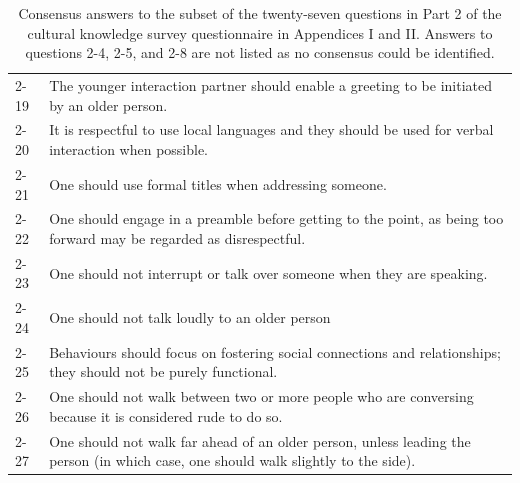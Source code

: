 \documentclass{CSSRforAfrica}
\begin{document}
\begin{table}[H]
\begin{center}
\begin{tabularx}{\linewidth}{|l|X|}
{\small 2-19 } & {\small The younger interaction partner should enable a greeting to be initiated by an older person.}\\
{\small 2-20 } & {\small It is respectful to use local languages and they should be used for verbal interaction when possible.}\\
{\small 2-21 } & {\small One should use formal titles when addressing someone.}\\
{\small 2-22 } & {\small One should engage in a preamble before getting to the point, as being too forward may be regarded as disrespectful.}\\
{\small 2-23 } & {\small One should not interrupt or talk over someone when they are speaking.}\\
{\small 2-24 } & {\small One should not talk loudly to an older person}\\
{\small 2-25 } & {\small Behaviours should focus on fostering social connections and relationships; they should not be
purely functional.}\\
{\small 2-26 } & {\small One should not walk between two or more people who are conversing because it is considered
rude to do so.}\\
{\small 2-27 } & {\small One should not walk far ahead of an older person, unless leading the person (in which case, one
should walk slightly to the side).}\\
\hline \hline
\end{tabularx}
\end{center}
\vspace{-5mm}
\caption{ Consensus answers to the subset of the twenty-seven questions in Part 2 of the cultural knowledge survey questionnaire in Appendices I and  II. Answers to questions 2-4, 2-5, and 2-8 are not listed as no consensus could be identified.}
\label{table:AllAnswers2}
\end{table}
\newpage
\end{document}
